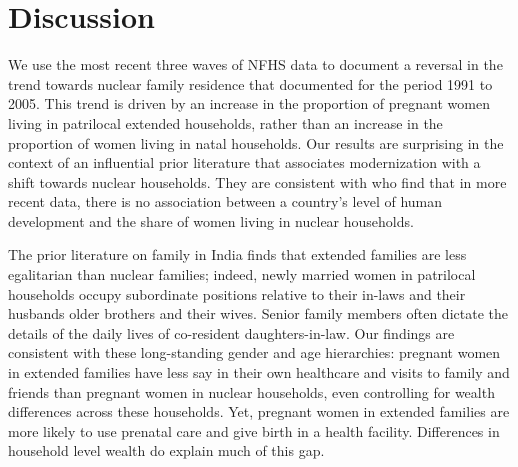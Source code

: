 \documentclass[12pt]{article}
\begin{document}
\newpage 
\section{Discussion}

We use the most recent three waves of NFHS data to document a reversal in the trend towards nuclear family residence that \cite{allendorf2013going} documented for the period 1991 to 2005.  This trend is driven by an increase in the proportion of pregnant women living in patrilocal extended households, rather than an increase in the proportion of women living in natal households. Our results are surprising in the context of an influential prior literature that associates modernization with a shift towards nuclear households.  They are consistent with \cite{pesando2018global} who find that in more recent data, there is no association between a country's level of human development and the share of women living in nuclear households.

The prior literature on family in India finds that extended families are less egalitarian than nuclear families; indeed, newly married women in patrilocal households occupy subordinate positions relative to their in-laws and their husbands older brothers and their wives. Senior family members often dictate the details of the daily lives of co-resident daughters-in-law. Our findings are consistent with these long-standing gender and age hierarchies: pregnant women in extended families have less say in their own healthcare and visits to family and friends than pregnant women in nuclear households, even controlling for wealth differences across these households. Yet, pregnant women in extended families are more likely to use prenatal care and give birth in a health facility.  Differences in household level wealth do explain much of this gap. 
\end{document}
